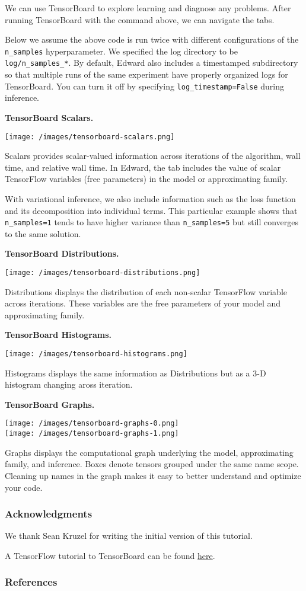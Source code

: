 We can use TensorBoard to explore learning and diagnose any problems.
After running TensorBoard with the command above, we can navigate the
tabs.

Below we assume the above code is run twice with different
configurations
of the \texttt{n_samples} hyperparameter.
We specified the log directory to be \texttt{log/n_samples_*}.
By default, Edward also includes a timestamped subdirectory so that
multiple runs of the same experiment have properly organized logs for
TensorBoard. You can turn it off by specifying
\texttt{log_timestamp=False} during inference.

\textbf{TensorBoard Scalars.}

\texttt{[image: /images/tensorboard-scalars.png]}

Scalars provides scalar-valued information across iterations of the
algorithm, wall time, and relative wall time. In Edward, the tab
includes the value of scalar TensorFlow variables (free parameters) in
the model or approximating family.

With variational inference, we also include information such as the
loss function and its decomposition into individual terms. This
particular example shows that \texttt{n_samples=1} tends to have higher
variance than \texttt{n_samples=5} but still converges to the same solution.

\textbf{TensorBoard Distributions.}

\texttt{[image: /images/tensorboard-distributions.png]}

Distributions displays the distribution of each non-scalar TensorFlow
variable across iterations. These variables are the free parameters
of your model and approximating family.

\textbf{TensorBoard Histograms.}

\texttt{[image: /images/tensorboard-histograms.png]}

Histograms displays the same information as Distributions but as a 3-D
histogram changing aross iteration.

\textbf{TensorBoard Graphs.}

\texttt{[image: /images/tensorboard-graphs-0.png]} \\
\texttt{[image: /images/tensorboard-graphs-1.png]}

Graphs displays the computational graph underlying the model,
approximating family, and inference. Boxes denote tensors grouped
under the same name scope. Cleaning up names in the graph makes it
easy to better understand and optimize your code.

\subsubsection{Acknowledgments}

We thank Sean Kruzel for writing the initial version of this
tutorial.

A TensorFlow tutorial to TensorBoard can be found
\href{https://www.tensorflow.org/get_started/summaries_and_tensorboard}
{here}.

\subsubsection{References}\label{references}
